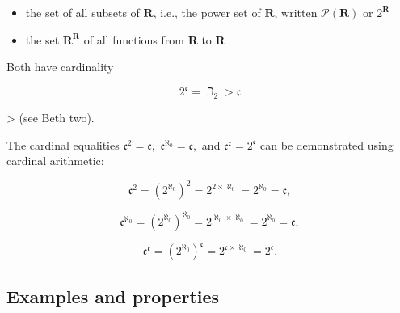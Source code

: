 \begin{itemize}
    \item the set of all subsets of $\mathbf{R}$, i.e., the power set of $\mathbf{R}$, written $\mathcal{P}(\mathbf{R})$ or $2^{\mathbf{R}}$
    \item the set $\mathbf{R}^{\mathbf{R}}$ of all functions from $\mathbf{R}$ to $\mathbf{R}$
\end{itemize}

Both have cardinality



$$2^\mathfrak {c} = \beth _2 > \mathfrak c$$



> (see Beth two).



The cardinal equalities $\mathfrak{c}^2 = \mathfrak{c},$ $\mathfrak c^{\aleph _0} =
\mathfrak c,$ and $\mathfrak c ^{\mathfrak c} = 2^{\mathfrak c}$ can be demonstrated using
cardinal arithmetic:



$$\mathfrak{c}^2 = \left(2^{\aleph _0}\right)^2 = 2^{2\times{\aleph _0}} = 2^{\aleph _0} = \mathfrak{c},$$



$$\mathfrak c^{\aleph _0} = \left(2^{\aleph _0}\right)^{\aleph _0} = 2^{{\aleph _0}\times{\aleph _0}} = 2^{\aleph _0} = \mathfrak{c},$$



$$\mathfrak c ^{\mathfrak c} = \left(2^{\aleph _0}\right)^{\mathfrak c} = 2^{\mathfrak c\times\aleph _0} = 2^{\mathfrak c}.$$




\subsection{Examples and properties}
\label{sss:exam-f8a1}




